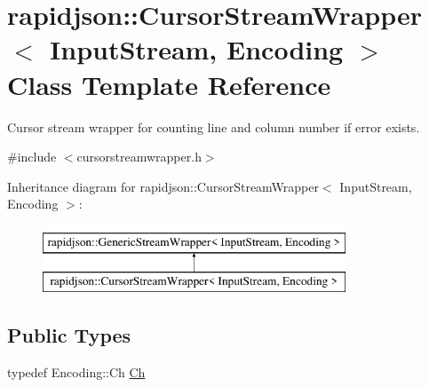 \hypertarget{classrapidjson_1_1_cursor_stream_wrapper}{}\section{rapidjson\+::Cursor\+Stream\+Wrapper$<$ Input\+Stream, Encoding $>$ Class Template Reference}
\label{classrapidjson_1_1_cursor_stream_wrapper}


Cursor stream wrapper for counting line and column number if error exists.  




{\ttfamily \#include $<$cursorstreamwrapper.\+h$>$}

Inheritance diagram for rapidjson\+::Cursor\+Stream\+Wrapper$<$ Input\+Stream, Encoding $>$\+:\begin{figure}[H]
\begin{center}
\leavevmode
\includegraphics[height=2.000000cm]{classrapidjson_1_1_cursor_stream_wrapper}
\end{center}
\end{figure}
\subsection*{Public Types}
\begin{DoxyCompactItemize}
\item 
typedef Encoding\+::\+Ch \mbox{\hyperlink{classrapidjson_1_1_cursor_stream_wrapper_a49421838afb7b754a756193896e8273b}{Ch}}
\end{DoxyCompactItemize}
